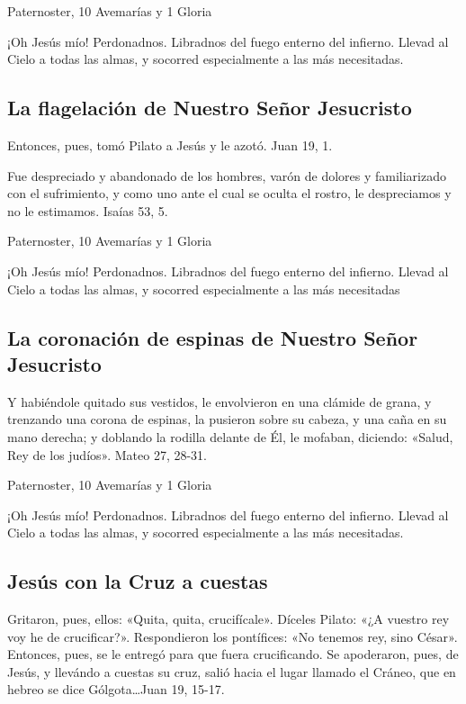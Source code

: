 \documentclass[a4paper,11pt, oneside]{report}
\begin{document}
         Paternoster, 10 Avemarías y 1 Gloria
        
        \medskip
        ¡Oh Jesús mío! Perdonadnos. Libradnos del fuego enterno del infierno. Llevad al Cielo a todas las almas, y socorred especialmente a las más necesitadas.
      
      \subsection*{La flagelación de Nuestro Señor Jesucristo}
        Entonces, pues, tomó Pilato a Jesús y le azotó. Juan 19, 1.
        
        \medskip
        Fue despreciado y abandonado de los hombres, varón de dolores y familiarizado con el sufrimiento, y como uno ante el cual
        se oculta el rostro, le despreciamos y no le estimamos. Isaías 53, 5.
        
         Paternoster, 10 Avemarías y 1 Gloria
        
        \medskip
        ¡Oh Jesús mío! Perdonadnos. Libradnos del fuego enterno del infierno. Llevad al Cielo a todas las almas, y socorred especialmente a las más 
        necesitadas
      
      \subsection*{La coronación de espinas de Nuestro Señor Jesucristo}

        Y habiéndole quitado sus vestidos, le envolvieron en una clámide de grana, y trenzando una corona de espinas, la pusieron sobre su cabeza, y una
        caña en su mano derecha; y doblando la rodilla delante de Él, le mofaban, diciendo: «Salud, Rey de los judíos». Mateo 27, 28-31.
        
         Paternoster, 10 Avemarías y 1 Gloria
        
        \medskip
        ¡Oh Jesús mío! Perdonadnos. Libradnos del fuego enterno del infierno. Llevad al Cielo a todas las almas, y socorred especialmente a las más necesitadas.
    
      \subsection*{Jesús con la Cruz a cuestas}
        Gritaron, pues, ellos: «Quita, quita, crucifícale». Díceles Pilato: «¿A vuestro rey voy he de crucificar?». Respondieron los pontífices: «No tenemos rey,
        sino César». Entonces, pues, se le entregó para que fuera crucificando. Se apoderaron, pues, de Jesús, y llevándo a cuestas su cruz, salió hacia el lugar
        llamado el Cráneo, que en hebreo se dice Gólgota\ldots Juan 19, 15-17.
\end{document}
